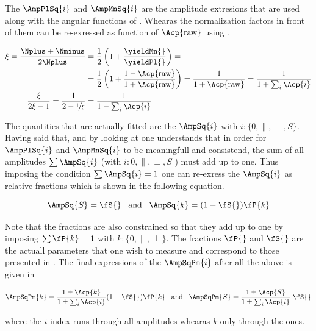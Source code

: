 \noindent The $\AmpPlSq{i}$ and $\AmpMnSq{i}$ are the amplitude extresions that are used along with the angular functions of .
Whearas the normalization factors in front of them can be re-exressed as function of $\Acp{\text{raw}}$ using .

\begin{align}
\xi = \frac{\Nplus+\Nminus}{2\Nplus} &= \frac{1}{2}\left( 1 + \frac{\yieldMn{}}{\yieldPl{}}\right) = \nonumber \\ 
                                     &= \frac{1}{2}\left( 1 + \frac{1-\Acp{\text{raw}}}{1+\Acp{\text{raw}}}\right) =
                                        \frac{1}{1+\Acp{\text{raw}}} = 
                                        \frac{1}{1+\sum_i\Acp{i}} \\
\frac{\xi}{2\xi-1} = \frac{1}{2-\nicefrac{1}{\xi}} &= \frac{1}{1-\sum_i\Acp{i}}
\label{amp_norms}
\end{align}

The quantities that are actually fitted are the $\AmpSq{i}$ with $i:\{0,\parallel,\perp,S\}$. Having said that, and by looking at 
one understands that in order for $\AmpPlSq{i}$ and $\AmpMnSq{i}$ to be meaningfull and consistend, the sum of all amplitudes $\sum\AmpSq{i}$ 
(with $i:{0,\parallel,\perp,S}$ ) must add up to one. Thus imposing the condition $\sum\AmpSq{i} = 1$ one can re-exress the $\AmpSq{i}$
as relative fractions which is shown in the following equation.

\begin{equation}
\AmpSq{S} = \fS{} \;\;\;\text{and}\;\;\; \AmpSq{k} = (1-\fS{})\fP{k}
\label{amps_param}
\end{equation}

Note that the \pwave fractions are also constrained so that they add up to one by imposing $\sum\fP{k}=1$ with $k:\{0,\parallel,\perp\}$.
The fractions $\fP{}$ and $\fS{}$ are the actuall parameters that one wish to measure and correspond to those presented in \secref{}.
The final expressions of the $\AmpSqPm{i}$ after all the above is given in 

\begin{equation}
\AmpSqPm{k} = \frac{1\pm\Acp{k}}{1\pm\sum_i\Acp{i}}  (1-\fS{})\fP{k}  \;\;\; \text{and}\;\;\; \AmpSqPm{S} = \frac{1\pm\Acp{S}}{1\pm\sum_i\Acp{i}} \; \fS{}
\label{amps_final}
\end{equation}

\noindent where the $i$ index runs through all amplitudes whearas $k$ only through the \pwave ones.

